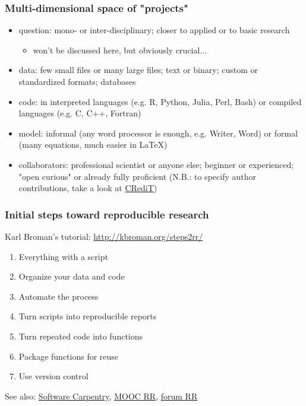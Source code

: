 \documentclass[c]{beamer} %
\begin{document}
\begin{frame}
  \frametitle{Multi-dimensional space of "projects"}
  \begin{itemize}
  \item \alert{question}: mono- or inter-disciplinary; closer to applied or to basic research
    \begin{itemize}
    \item won't be discussed here, but obviously crucial...
    \end{itemize}
    \medskip
    \pause
  \item \alert{data}: few small files or many large files; text or binary; custom or standardized formats; databases
    \medskip
    \pause
  \item \alert{code}: in interpreted languages (e.g. R, Python, Julia, Perl, Bash) or compiled languages (e.g. C, C++, Fortran)
    \medskip
    \pause
  \item \alert{model}: informal (any word processor is enough, e.g. Writer, Word) or formal (many equations, much easier in LaTeX)
    \medskip
    \pause
  \item \alert{collaborators}: professional scientist or anyone else; beginner or experienced; "open curious" or already fully proficient (N.B.: to specify author contributions, take a look at \href{https://www.casrai.org/credit.html}{CRediT})
  \end{itemize}
\end{frame}

\begin{frame}
  \frametitle{Initial steps toward reproducible research}
  Karl Broman's tutorial: \url{http://kbroman.org/steps2rr/}
  
  \bigskip
  
  \begin{enumerate}
  \item Everything with a script
  \item Organize your data and code
  \item Automate the process
  \item Turn scripts into reproducible reports
  \item Turn repeated code into functions
  \item Package functions for reuse
  \item Use version control
  \end{enumerate}
  
  \bigskip
  \pause
  
  See also: \href{http://software-carpentry.org/}{Software Carpentry}, \href{https://www.fun-mooc.fr/courses/course-v1:inria+41016+session01bis/about}{MOOC RR}, \href{https://reproducible-research.inria.fr/}{forum RR}
\end{frame}
\end{document}
